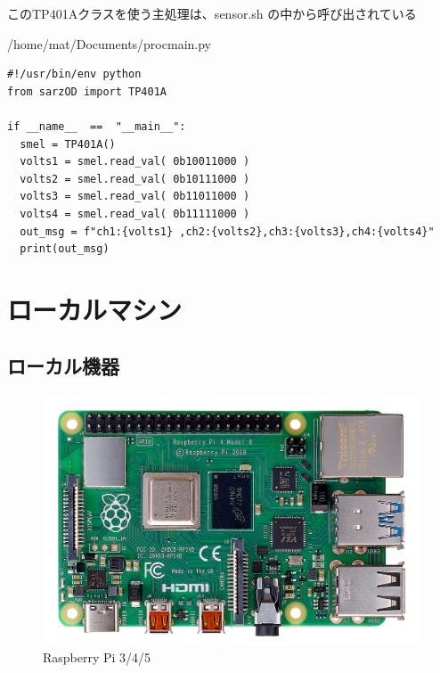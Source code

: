 \documentclass[12pt,a4paper,uplatex]{jsarticle}
\begin{document}
このTP401Aクラスを使う主処理は、sensor.sh の中から呼び出されている

\begin{itembox}[l]{/home/mat/Documents/procmain.py}
	\begin{verbatim}
#!/usr/bin/env python
from sarzOD import TP401A

if __name__  ==  "__main__":
  smel = TP401A()
  volts1 = smel.read_val( 0b10011000 ) 
  volts2 = smel.read_val( 0b10111000 ) 
  volts3 = smel.read_val( 0b11011000 ) 
  volts4 = smel.read_val( 0b11111000 )
  out_msg = f"ch1:{volts1} ,ch2:{volts2},ch3:{volts3},ch4:{volts4}" 
  print(out_msg)
	\end{verbatim}
\end{itembox}

\section{ローカルマシン}

\subsection{ローカル機器}

\begin{figure}[H]
	\begin{minipage}[b]{1.0\linewidth}
		\centering
		\includegraphics[keepaspectratio, scale=0.12]{figs/jpg/udrp4b_front.jpg}
		\caption{Raspberry Pi 3/4/5}
	\end{minipage}
\end{figure}
\end{document}

